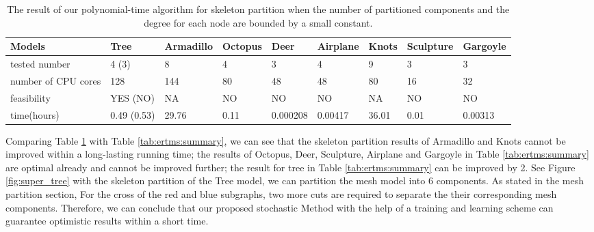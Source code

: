 \begin{table}[htb]

\begin{footnotesize}

\begin{center}

    \begin{tabular}{p{3.0cm} p{1.55cm} p{1.3cm} p{1.0cm} p{1.3cm} p{2.25cm} p{1.2cm} p{1.2cm}p{1.4cm}}

    \hline

     Models          & Tree       & Armadillo      & Octopus   & Deer      & Airplane          & Knots    &Sculpture  & Gargoyle\\ \hline
     tested number   & 4 (3)      & 8              & 4         & 3         & 4             & 9        & 3         &3 \\ \hline
     number of CPU cores &128         & 144            & 80    & 48        &48             & 80       &16         &32 \\ \hline
     feasibility     & YES (NO)   & NA             & NO        & NO        &NO           & NA       & NO        & NO  \\ \hline
     time(hours)     &0.49 (0.53) & 29.76          & 0.11      &0.000208   &0.00417  & 36.01    &0.01       &0.00313 \\ \hline

    \end{tabular}

\end{center}

\end{footnotesize}

\caption{The result of our polynomial-time algorithm for skeleton partition when the number of partitioned components and the degree for each node are bounded by a small constant.}\label{tab:ertms:super}

\end{table}


Comparing Table \ref{tab:ertms:super} with Table \ref{tab:ertms:summary}, we can see that the skeleton partition results of Armadillo and Knots cannot be improved within a long-lasting running time; the results of Octopus, Deer, Sculpture, Airplane and Gargoyle in Table \ref{tab:ertms:summary} are optimal already and cannot be improved further; the result for tree in Table \ref{tab:ertms:summary} can be improved by 2. 
{\color{red} {See Figure \ref{fig:super_tree} with the skeleton partition of the Tree model, we can partition the mesh model into 6 components. As stated in the mesh partition section, For the cross of the red and blue subgraphs, two more cuts are required to separate the their corresponding mesh components. Therefore, we can conclude that our proposed stochastic Method with the help of a training and learning scheme can guarantee optimistic results within a short time.}}


